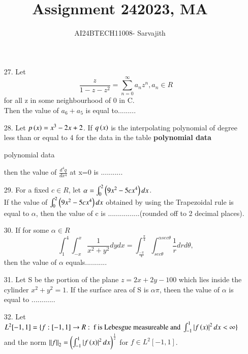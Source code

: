 \documentclass[journal]{IEEEtran}
\begin{document}

\vspace{3cm}


\author{AI24BTECH11008- Sarvajith
}
\title{Assignment 24}
{\let\newpage\relax\maketitle}
\title{2023, MA}
\renewcommand{\thefigure}{\theenumi}
\renewcommand{\thetable}{\theenumi}
\setlength{\intextsep}{10pt} %
\renewcommand{\thetable}{\theenumi}
\begin{enumerate}
    \item[27.] Let $$\frac{z}{1-z-z^2} = \sum_{n=0}^{\infty}a_nz^n, a_n \in R$$ for all z in some neighbourhood of 0 in C.\\ Then the value of $a_6+a_5$ is equal to......... 
    \item[28.] Let $p\left(x\right)=x^3-2x+2$. If $q\left(x\right)$ is the interpolating polynomial of degree less than or equal to 4 for the data in the table \textbf{polynomial data}\\
    \begin{table}
        \centering
        \caption{polynomial data}
    \end{table}
    then the value of $\frac{d^4q}{dx^4}$ at x=0 is ...........
    \item[29.] For a fixed $c \in R$, let $\alpha = \int_{0}^{2}\left(9x^2-5cx^4\right)dx$.\\ If the value of $\int_{0}^{2}\left(9x^2-5cx^4\right)dx$ obtained by using the Trapezoidal rule is equal to $\alpha$, then the value of c is ................(rounded off to 2 decimal places).
    \item[30.] If for some $\alpha \in R$ $$\int_{1}^{4}\int_{-x}^{x}\frac{1}{x^2+y^2}dydx = \int_{\frac{-\pi}{4}}^{\frac{\pi}{4}}\int_{sec\theta}^{\alpha sec\theta}\frac{1}{r}drd\theta,$$ then the value of $\alpha$ equals...........
    \item[31.] Let S be the portion of the plane $z=2x+2y-100$ which lies inside the cylinder $x^2+y^2=1$. If the surface area of S is $\alpha\pi$, theen the value of $\alpha$ is equal to ............ 
    \item[32.] Let $L^2[-1,1] = \{f:[-1,1]\to R:\text{ f is Lebesgue measureable and }\int_{-1}^{1}\left\vert f\left(x\right)\right\vert^2dx<\infty\}$ and the norm $\left\lVert f\right\rVert_2=\left(\int_{-1}^{1}\left\vert f\left(x\right)\right\vert^2dx\right)^{\frac{1}{2}}$ for $f\in L^2[-1,1]$.\\

\end{enumerate}
\end{document}
